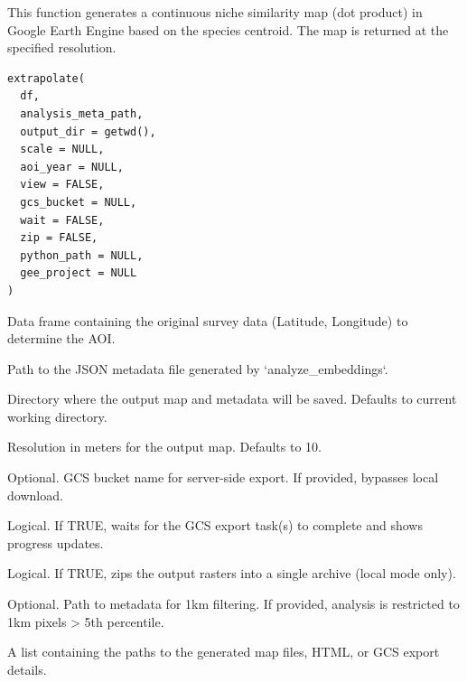 \documentclass[letterpaper]{book}
\begin{document}
%
\begin{Description}
This function generates a continuous niche similarity map (dot product) in Google Earth Engine
based on the species centroid. The map is returned at the specified resolution.
\end{Description}
%
\begin{Usage}
\begin{verbatim}
extrapolate(
  df,
  analysis_meta_path,
  output_dir = getwd(),
  scale = NULL,
  aoi_year = NULL,
  view = FALSE,
  gcs_bucket = NULL,
  wait = FALSE,
  zip = FALSE,
  python_path = NULL,
  gee_project = NULL
)
\end{verbatim}
\end{Usage}
%
\begin{Arguments}
\begin{ldescription}
\item[\code{df}] Data frame containing the original survey data (Latitude, Longitude) to determine the AOI.

\item[\code{analysis\_meta\_path}] Path to the JSON metadata file generated by `analyze\_embeddings`.

\item[\code{output\_dir}] Directory where the output map and metadata will be saved. Defaults to current working directory.

\item[\code{scale}] Resolution in meters for the output map. Defaults to 10.

\item[\code{gcs\_bucket}] Optional. GCS bucket name for server-side export. If provided, bypasses local download.

\item[\code{wait}] Logical. If TRUE, waits for the GCS export task(s) to complete and shows progress updates.

\item[\code{zip}] Logical. If TRUE, zips the output rasters into a single archive (local mode only).

\item[\code{coarse\_meta\_path}] Optional. Path to metadata for 1km filtering. If provided, analysis is restricted to 1km pixels > 5th percentile.
\end{ldescription}
\end{Arguments}
%
\begin{Value}
A list containing the paths to the generated map files, HTML, or GCS export details.
\end{Value}
\end{document}
